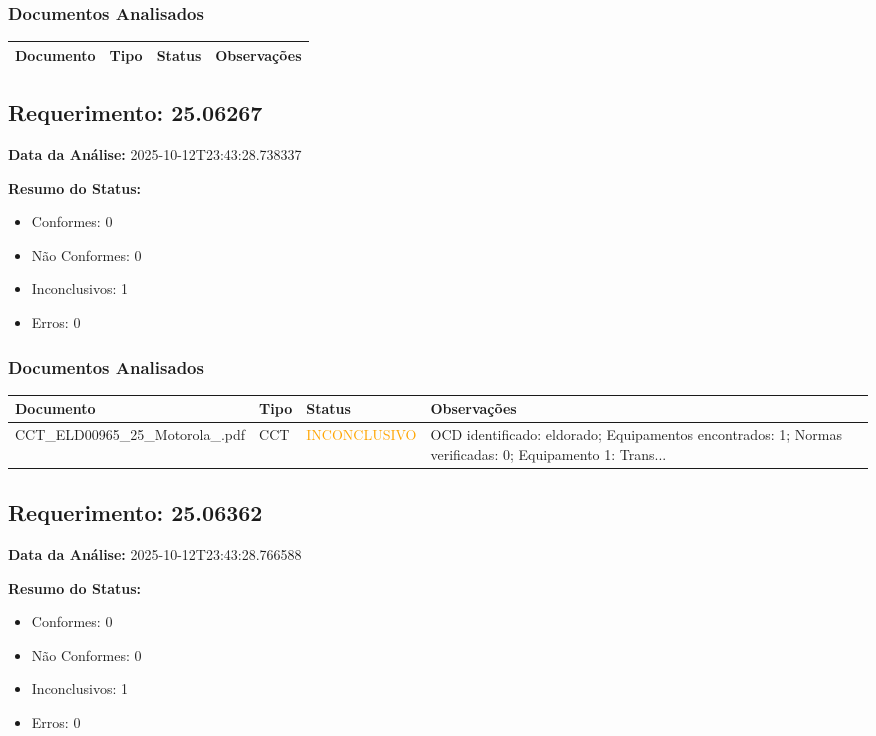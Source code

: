 \documentclass[12pt,a4paper]{article}
\begin{document}
\subsubsection{Documentos Analisados}

\begin{longtable}{|p{4cm}|p{2cm}|p{2cm}|p{6cm}|}
\hline
\textbf{Documento} & \textbf{Tipo} & \textbf{Status} & \textbf{Observações} \\
\hline
\endhead
\end{longtable}


\subsection{Requerimento: 25.06267}

\textbf{Data da Análise:} 2025-10-12T23:43:28.738337

\textbf{Resumo do Status:}
\begin{itemize}
    \item Conformes: 0
    \item Não Conformes: 0
    \item Inconclusivos: 1
    \item Erros: 0
\end{itemize}

\subsubsection{Documentos Analisados}

\begin{longtable}{|p{4cm}|p{2cm}|p{2cm}|p{6cm}|}
\hline
\textbf{Documento} & \textbf{Tipo} & \textbf{Status} & \textbf{Observações} \\
\hline
\endhead
CCT\_ELD00965\_25\_Motorola\_.pdf & CCT & \textcolor{orange}{INCONCLUSIVO} & OCD identificado: eldorado; Equipamentos encontrados: 1; Normas verificadas: 0; Equipamento 1: Trans... \\
\hline
\end{longtable}


\subsection{Requerimento: 25.06362}

\textbf{Data da Análise:} 2025-10-12T23:43:28.766588

\textbf{Resumo do Status:}
\begin{itemize}
    \item Conformes: 0
    \item Não Conformes: 0
    \item Inconclusivos: 1
    \item Erros: 0
\end{itemize}
\end{document}
